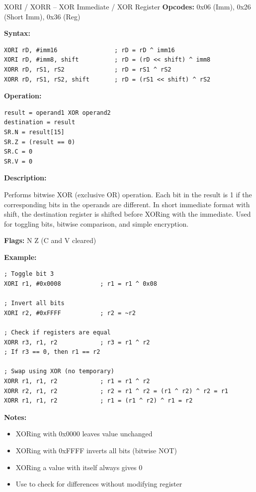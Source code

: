 \begin{instructionbox}{XORI / XORR -- XOR Immediate / XOR Register}
	\textbf{Opcodes:} 0x06 (Imm), 0x26 (Short Imm), 0x36 (Reg)

	\textbf{Syntax:}
	\begin{lstlisting}
XORI rD, #imm16                ; rD = rD ^ imm16
XORI rD, #imm8, shift          ; rD = (rD << shift) ^ imm8
XORR rD, rS1, rS2              ; rD = rS1 ^ rS2
XORR rD, rS1, rS2, shift       ; rD = (rS1 << shift) ^ rS2
\end{lstlisting}

	\textbf{Operation:}
	\begin{verbatim}
result = operand1 XOR operand2
destination = result
SR.N = result[15]
SR.Z = (result == 0)
SR.C = 0
SR.V = 0
\end{verbatim}

	\textbf{Description:}

	Performs bitwise XOR (exclusive OR) operation. Each bit in the result is 1 if the corresponding bits in the operands
	are different. In short immediate format with shift, the destination register is shifted before XORing with the
	immediate. Used for toggling bits, bitwise comparison, and simple encryption.

	\textbf{Flags:} N Z (C and V cleared)

	\textbf{Example:}
	\begin{lstlisting}
; Toggle bit 3
XORI r1, #0x0008           ; r1 = r1 ^ 0x08

; Invert all bits
XORI r2, #0xFFFF           ; r2 = ~r2

; Check if registers are equal
XORR r3, r1, r2            ; r3 = r1 ^ r2
; If r3 == 0, then r1 == r2

; Swap using XOR (no temporary)
XORR r1, r1, r2            ; r1 = r1 ^ r2
XORR r2, r1, r2            ; r2 = r1 ^ r2 = (r1 ^ r2) ^ r2 = r1
XORR r1, r1, r2            ; r1 = (r1 ^ r2) ^ r1 = r2
\end{lstlisting}

	\textbf{Notes:}
	\begin{itemize}
		\item XORing with 0x0000 leaves value unchanged
		\item XORing with 0xFFFF inverts all bits (bitwise NOT)
		\item XORing a value with itself always gives 0
		\item Use  to check for differences without modifying register
	\end{itemize}
\end{instructionbox}

